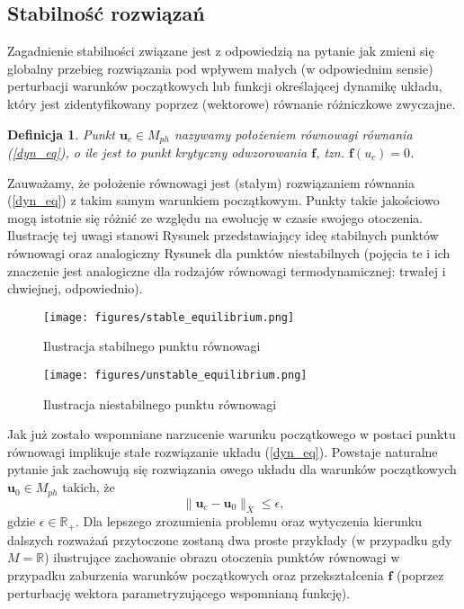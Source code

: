 \documentclass[12pt]{article}
\newtheorem{defi}{Definicja}
\begin{document}
\subsection{Stabilność rozwiązań}
Zagadnienie stabilności związane jest z odpowiedzią na pytanie jak zmieni się globalny przebieg rozwiązania pod wpływem małych (w odpowiednim sensie) perturbacji warunków początkowych lub funkcji określającej dynamikę układu, który jest zidentyfikowany poprzez (wektorowe) równanie różniczkowe zwyczajne.
\begin{defi}\label{crit_points}
	Punkt $ \textbf{u}_{c} \in M_{ph}$ nazywamy położeniem równowagi równania (\ref{dyn_eq}), o ile jest to punkt krytyczny odwzorowania $ \textbf{f} $, tzn. $ \textbf{f}(u_{c}) = 0 $.
\end{defi}
Zauważamy, że położenie równowagi jest (stałym) rozwiązaniem równania (\ref{dyn_eq}) z takim samym warunkiem początkowym. Punkty takie jakościowo mogą istotnie się różnić ze względu na ewolucję w czasie swojego otoczenia. Ilustrację tej uwagi stanowi Rysunek przedstawiający ideę stabilnych  punktów równowagi oraz analogiczny Rysunek dla punktów niestabilnych (pojęcia te i ich znaczenie jest analogiczne dla rodzajów równowagi termodynamicznej: trwałej i chwiejnej, odpowiednio).
\begin{figure}[H]
	\texttt{[image: figures/stable\_equilibrium.png]}
	\centering
	\caption{Ilustracja stabilnego punktu równowagi}
\end{figure}
\begin{figure}[H]
	\texttt{[image: figures/unstable\_equilibrium.png]} 
	\centering
	\caption{Ilustracja niestabilnego punktu równowagi}
\end{figure}
Jak już zostało wspomniane narzucenie warunku początkowego w postaci punktu równowagi implikuje stałe rozwiązanie układu (\ref{dyn_eq}). Powstaje naturalne pytanie jak zachowują się rozwiązania owego układu dla warunków początkowych  $ \textbf{u}_{0} \in M_{ph}$ takich, że
\begin{equation}
	\| \textbf{u}_{c} - \textbf{u}_{0} \|_{X}  \leq \epsilon,
\label{x_xc}
\end{equation}
gdzie $ \epsilon \in \mathbb{R}_{+} $.\newline
Dla lepszego zrozumienia problemu oraz wytyczenia kierunku dalszych rozważań przytoczone zostaną dwa proste przykłady (w przypadku gdy $ M = \mathbb{R} $) ilustrujące zachowanie obrazu otoczenia punktów równowagi w przypadku zaburzenia warunków początkowych oraz przekształcenia $ \textbf{f} $ (poprzez perturbację wektora parametryzującego wspomnianą funkcję). \newline
\end{document}
